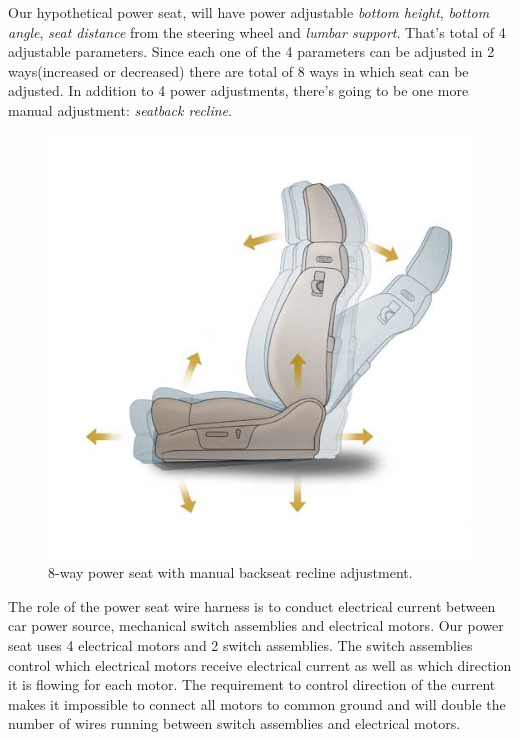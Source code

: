 \documentclass[12pt,letterpaper]{article}
\begin{document}
Our hypothetical power seat, will have power adjustable \textit{bottom height}, \textit{bottom angle}, \textit{seat distance} from the steering wheel and \textit{lumbar support}. That’s total of 4 adjustable parameters. Since each one of the 4 parameters can be adjusted in 2 ways(increased or decreased) there are total of 8 ways in which seat can be adjusted. In addition to 4 power adjustments, there’s going to be one more manual adjustment: \textit{seatback recline}.
\begin{figure}[b!]
  \centering
  \includegraphics[width=0.70\linewidth]{8-way-seat.jpg}
  \caption{8-way power seat with manual backseat recline adjustment.}
  \label{fig:wireharness1}
\end{figure}
\newpage
{}
The role of the power seat wire harness is to conduct electrical current between car power source, mechanical switch assemblies and electrical motors. Our power seat uses 4 electrical motors and 2 switch assemblies. The switch assemblies control which electrical motors receive electrical current as well as which direction it is flowing for each motor. The requirement to control direction of the current makes it impossible to connect all motors to common ground and will double the number of wires running between switch assemblies and electrical motors.

\nopagebreak 
\begin{figure}[h]
\centering
\def\svgwidth{0.5\columnwidth}

\end{figure}
\clearpage
\end{document}
